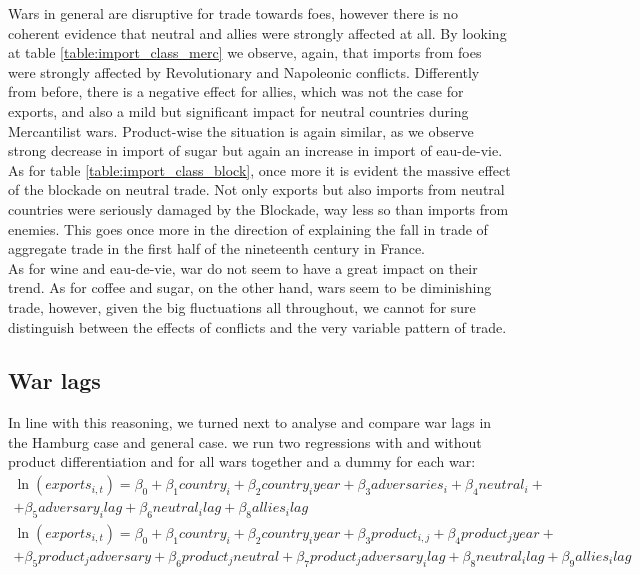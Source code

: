 \documentclass[12pt,a4paper,notitlepage,english]{article}
\begin{document}
Wars in general are disruptive for trade towards foes, however there is no coherent evidence that neutral and allies were strongly affected at all.
By looking at table \ref{table:import_class_merc} we observe, again, that imports from foes were strongly affected by Revolutionary and Napoleonic conflicts.
Differently from before, there is a negative effect for allies, which was not the case for exports, and also a mild but significant impact for neutral countries during Mercantilist wars.
Product-wise the situation is again similar, as we observe strong decrease in import of sugar but again an increase in import of eau-de-vie.
As for table \ref{table:import_class_block}, once more it is evident the massive effect of the blockade on neutral trade.
Not only exports but also imports from neutral countries were seriously damaged by the Blockade, way less so than imports from enemies.
This goes once more in the direction of explaining the fall in trade of aggregate trade in the first half of the nineteenth century in France. \\

\fi
As for wine and eau-de-vie, war do not seem to have a great impact on their trend.
As for coffee and sugar, on the other hand, wars seem to be diminishing trade, however, given the big fluctuations all throughout, we cannot for sure distinguish between the effects of conflicts and the very variable pattern of trade.

\iffalse
\subsection{War lags}
In line with this reasoning, we turned next to analyse and compare war lags in the Hamburg case and general case.
we run two regressions with and without product differentiation and for all wars together and a dummy for each war: 
\begin{multline}
\ln(exports_{i,t})=\beta_0+\beta_1country_i+\beta_2country_iyear+\beta_3adversaries_i+\beta_4neutral_i+\\+\beta_5adversary_ilag+\beta_6neutral_ilag+\beta_8allies_ilag
\end{multline}
\begin{multline}
\ln(exports_{i,t})=\beta_0+\beta_1country_i+\beta_2country_iyear+\beta_3product_{i,j}+\beta_4product_jyear+\\+\beta_5product_jadversary+ \beta_6product_jneutral+\beta_7product_jadversary_ilag+\beta_8neutral_ilag+\beta_9allies_ilag
\end{multline}
\end{document}
